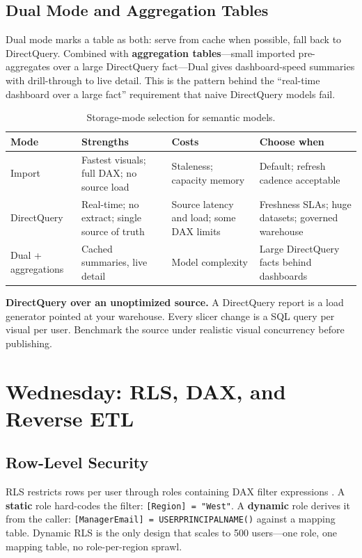 \subsection{Dual Mode and Aggregation Tables}
Dual mode marks a table as both: serve from cache when possible, fall back to DirectQuery. Combined with \textbf{aggregation tables}---small imported pre-aggregates over a large DirectQuery fact---Dual gives dashboard-speed summaries with drill-through to live detail. This is the pattern behind the ``real-time dashboard over a large fact'' requirement that naive DirectQuery models fail.

\begin{table}[H]
\centering
\small
\begin{tabular}{@{}p{2.6cm}p{4.0cm}p{3.6cm}p{3.4cm}@{}}
\toprule
\textbf{Mode} & \textbf{Strengths} & \textbf{Costs} & \textbf{Choose when} \\
\midrule
Import & Fastest visuals; full DAX; no source load & Staleness; capacity memory & Default; refresh cadence acceptable \\
DirectQuery & Real-time; no extract; single source of truth & Source latency and load; some DAX limits & Freshness SLAs; huge datasets; governed warehouse \\
Dual + aggregations & Cached summaries, live detail & Model complexity & Large DirectQuery facts behind dashboards \\
\bottomrule
\end{tabular}
\caption{Storage-mode selection for semantic models.}
\label{tab:ch16-storage-modes}
\end{table}

\begin{pitfall}
\textbf{DirectQuery over an unoptimized source.} A DirectQuery report is a load generator pointed at your warehouse. Every slicer change is a SQL query per visual per user. Benchmark the source under realistic visual concurrency before publishing.
\end{pitfall}

\section{Wednesday: RLS, DAX, and Reverse ETL}

\subsection{Row-Level Security}
RLS restricts rows per user through roles containing DAX filter expressions \cite{microsoft2025powerbiRLS}. A \textbf{static} role hard-codes the filter: \texttt{[Region] = "West"}. A \textbf{dynamic} role derives it from the caller: \texttt{[ManagerEmail] = USERPRINCIPALNAME()} against a mapping table. Dynamic RLS is the only design that scales to 500 users---one role, one mapping table, no role-per-region sprawl.

